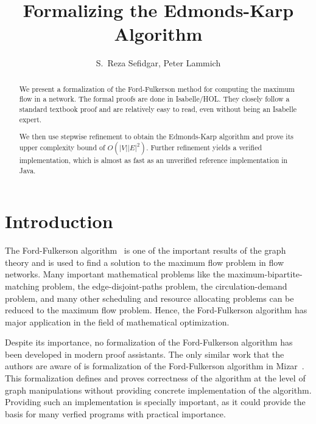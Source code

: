 \documentclass{llncs}
\begin{document}
\title{Formalizing the Edmonds-Karp Algorithm}

\author{S.~Reza Sefidgar, Peter Lammich}


\maketitle
\begin{abstract}
We present a formalization of the Ford-Fulkerson method for computing the maximum flow in a network. 
The formal proofs are done in Isabelle/HOL. They closely follow a standard textbook proof and are relatively easy 
to read, even without being an Isabelle expert.

We then use stepwise refinement to obtain the Edmonds-Karp algorithm and prove its upper complexity bound of $O(|V||E|^2)$.
Further refinement yields a verified implementation, which is almost as fast as an unverified  
reference implementation in Java. 

% 
% 
\end{abstract}

\section{Introduction}
The Ford-Fulkerson algorithm~\cite{FF56} is one of the important results of the graph theory and is used to find a solution to the maximum flow problem in flow networks. Many important mathematical problems like the maximum-bipartite-matching problem, the edge-disjoint-paths problem, the circulation-demand problem, and many other scheduling and resource allocating problems can be reduced to the maximum flow problem. Hence, the Ford-Fulkerson algorithm has major application in the field of mathematical optimization.

Despite its importance, no formalization of the Ford-Fulkerson algorithm has been developed in modern proof assistants. The only similar work that the authors are aware of is formalization of the Ford-Fulkerson algorithm in Mizar~\cite{Lee05}. This formalization defines and proves correctness of the algorithm at the level of graph manipulations without providing concrete implementation of the algorithm. Providing such an implementation is specially important, as it could provide the basis for many verfied programs with practical importance.
\end{document}
